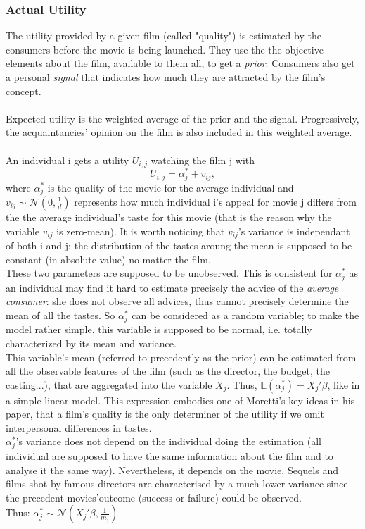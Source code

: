 	\subsubsection{Actual Utility}
	The utility provided by a given film (called "quality") is estimated by the consumers before the movie is being launched. They use the the objective elements about the film, available to them all, to get a \textit{prior}. Consumers also get a personal \textit{signal} that indicates how much they are attracted by the film's concept.\\
	\\
	Expected utility is the weighted average of the prior and the signal. Progressively, the acquaintancies' opinion on the film is also included in this weighted average. \\
	\\
	An individual i gets a utility $U_{i,j}$ watching the film j with\\
	\begin{equation} \label{eq:1}
		U_{i,j}=\alpha_{j}^{*}+v_{i j},
	\end{equation}
	where $\alpha_{j}^{*}$ is the quality of the movie for the average individual and $v_{i j}\sim \mathcal{N}(0,\frac{1}{d})$ represents how much individual i's appeal for movie j differs from the the average individual's taste for this movie (that is the reason why the variable $v_{i j}$ is zero-mean). It is worth noticing that $v_{i j}$'s variance is independant of both i and j: the distribution of the tastes aroung the mean is supposed to be constant (in absolute value) no matter the film.\\
	These two parameters are supposed to be unobserved. This is consistent for $\alpha_{j}^{*}$ as an individual may find it hard to estimate precisely the advice of the \textit{average consumer}: she does not observe all advices, thus cannot precisely determine the mean of all the tastes. So $\alpha_{j}^{*}$ can be considered as a random variable; to make the model rather simple, this variable is supposed to be normal, i.e. totally characterized by its mean and variance.\\
	This variable's mean (referred to precedently as the prior) can be estimated from all the observable features of the film (such as the director, the budget, the casting...), that are aggregated into the variable $X_{j}$. Thus, $\mathbb{E}(\alpha_{j}^{*})=X_{j}'\beta$, like in a simple linear model. This expression embodies one of Moretti's key ideas in his paper, that a film's quality is the only determiner of the utility if we omit interpersonal differences in tastes.\\
	$\alpha_{j}^{*}$'s variance does not depend on the individual doing the estimation (all individual are supposed to have the same information about the film and to analyse it the same way). Nevertheless, it depends on the movie. Sequels and films shot by famous directors are characterised by a much lower variance since the precedent movies'outcome (success or failure) could be observed.\\
	Thus: $\alpha_{j}^{*}\sim \mathcal{N}(X_{j}'\beta,\frac{1}{m_{j}})$\\
	
